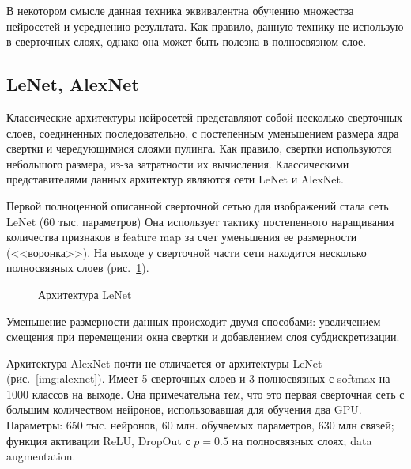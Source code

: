 \documentclass[12pt, specialist, subf, substylefile = spbu.rtx]{disser}
\begin{document}
В некотором смысле данная техника эквивалентна обучению множества нейросетей и усреднению результата. Как правило, данную технику не использую в сверточных слоях, однако она может быть полезна в полносвязном слое.

\subsection{LeNet, AlexNet}

Классические архитектуры нейросетей представляют собой несколько сверточных слоев, соединенных последовательно, с постепенным уменьшением размера ядра свертки и чередующимися слоями пулинга. Как правило, свертки используются небольшого размера, из-за затратности их вычисления. Классическими представителями данных архитектур являются сети LeNet и AlexNet.

Первой полноценной описанной сверточной сетью для изображений стала сеть LeNet (60 тыс. параметров) Она использует тактику постепенного наращивания количества признаков в feature map за счет уменьшения ее размерности (<<воронка>>). На выходе у сверточной части сети находится несколько полносвязных слоев (рис.~\ref{img:lenet}).

\begin{figure}[h]
\caption{Архитектура LeNet}
\label{img:lenet}
\end{figure}

Уменьшение размерности данных происходит двумя способами: увеличением смещения при перемещении окна свертки и добавлением слоя субдискретизации.

Архитектура AlexNet почти не отличается от архитектуры LeNet (рис.~\ref{img:alexnet}). Имеет 5 сверточных слоев и 3 полносвязных с softmax на 1000 классов на выходе. Она примечательна тем, что это первая сверточная сеть с большим количеством нейронов, использовавшая для обучения два GPU. Параметры: 650 тыс. нейронов, 60 млн. обучаемых параметров, 630 млн связей; функция активации ReLU, 
DropOut с $p=0.5$ на полносвязных слоях; data augmentation.
\end{document}
